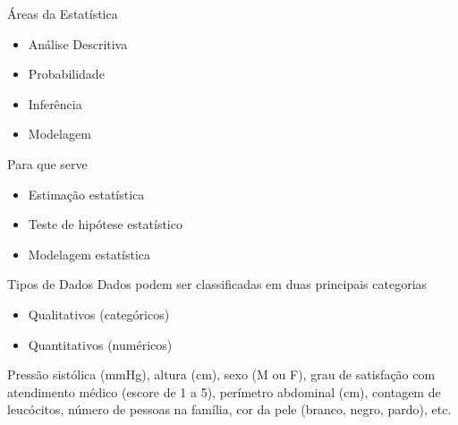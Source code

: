 \documentclass{beamer}
\begin{document}

\begin{frame}{Áreas da Estatística}
  \begin{itemize}
  \item Análise Descritiva
  \item Probabilidade
  \item Inferência
  \item Modelagem
  \end{itemize}
\end{frame}

\begin{frame}{Para que serve}
  \begin{itemize}
  \item Estimação estatística
  \item Teste de hipótese estatístico
  \item Modelagem estatística
  \end{itemize}
\end{frame}



\begin{frame}{Tipos de Dados}
Dados podem ser classificadas em duas principais categorias
  \begin{itemize}
  \item Qualitativos (categóricos)
  \item Quantitativos (numéricos)
  \end{itemize}
  \begin{example}
    Pressão sistólica (mmHg), altura (cm), sexo (M ou F), grau de
    satisfação com atendimento médico (escore de 1 a 5), perímetro
    abdominal (cm), contagem de leucócitos, número de pessoas na
    família, cor da pele (branco, negro, pardo), etc.
  \end{example}

\end{frame}
\end{document}
